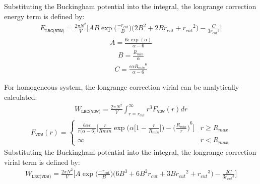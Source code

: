\documentclass[letterpaper,10pt,english]{sphinxmanual}
\begin{document}
\begin{description}
Substituting the Buckingham potential into the integral, the long\sphinxhyphen{}range correction energy term is defined by:
\begin{equation*}
\begin{split}E_{\texttt{LRC(VDW)}} = \frac{2\pi N^2}{V} \bigg[AB \exp\big(\frac{-r_{cut}}{B}\big) \bigg(2 B^2 + 2 B r_{cut} + {r_{cut}}^2 \bigg) - \frac{C}{3 {r_{cut}}^3}   \bigg]\end{split}
\end{equation*}\begin{equation*}
\begin{split}A = \frac{6 \epsilon \exp(\alpha)}{\alpha - 6}\end{split}
\end{equation*}\begin{equation*}
\begin{split}B = \frac{R_{min}}{\alpha}\end{split}
\end{equation*}\begin{equation*}
\begin{split}C = \frac{\epsilon \alpha {R_{min}}^6}{\alpha - 6}\end{split}
\end{equation*}
\item[{\sphinxcode{\sphinxupquote{Virial}}}] \leavevmode
For homogeneous system, the long\sphinxhyphen{}range correction virial can be analytically calculated:
\begin{equation*}
\begin{split}W_{\texttt{LRC(VDW)}} = \frac{2\pi N^2}{V} \int_{r=r_{cut}}^{\infty} r^3 F_{\texttt{VDW}}(r) dr\end{split}
\end{equation*}\begin{equation*}
\begin{split}F_{\texttt{VDW}}(r) =
\begin{cases}
  \frac{6 \alpha\epsilon}{r\big(\alpha-6\big)} \bigg[\frac{r}{R{min}} \exp\bigg(\alpha \bigg[1-\frac{r}{R_{min}} \bigg]\bigg) - {\bigg(\frac{R_{min}}{r}\bigg)}^6 \bigg] &  r \geq R_{max} \\
  \infty & r < R_{max}
\end{cases}\end{split}
\end{equation*}
Substituting the Buckingham potential into the integral, the long\sphinxhyphen{}range correction virial term is defined by:
\begin{equation*}
\begin{split}W_{\texttt{LRC(VDW)}} = \frac{2\pi N^2}{V} \bigg[A \exp\big(\frac{-r_{cut}}{B}\big) \bigg(6 B^3 + 6 B^2 r_{cut} + 3 B {r_{cut}}^2 + {r_{cut}}^3 \bigg) - \frac{2C}{3 {r_{cut}}^3}   \bigg]\end{split}
\end{equation*}
\end{description}
\end{document}
